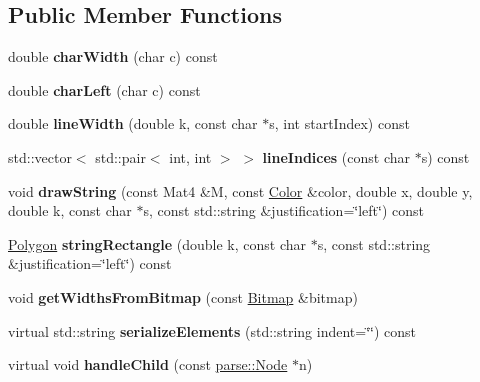 \subsection*{Public Member Functions}
\begin{DoxyCompactItemize}
\item 
\hypertarget{classg2c_1_1_font_aa03376086a0e53e02025277774d4f926}{
double {\bfseries charWidth} (char c) const }
\label{classg2c_1_1_font_aa03376086a0e53e02025277774d4f926}

\item 
\hypertarget{classg2c_1_1_font_a2ac044478305dfd8447c7ba05da0bbcc}{
double {\bfseries charLeft} (char c) const }
\label{classg2c_1_1_font_a2ac044478305dfd8447c7ba05da0bbcc}

\item 
\hypertarget{classg2c_1_1_font_a5712609addff68f271d091e1d3174b0f}{
double {\bfseries lineWidth} (double k, const char $\ast$s, int startIndex) const }
\label{classg2c_1_1_font_a5712609addff68f271d091e1d3174b0f}

\item 
\hypertarget{classg2c_1_1_font_ac47823fde56a234c1c73a479b9eab032}{
std::vector$<$ std::pair$<$ int, int $>$ $>$ {\bfseries lineIndices} (const char $\ast$s) const }
\label{classg2c_1_1_font_ac47823fde56a234c1c73a479b9eab032}

\item 
\hypertarget{classg2c_1_1_font_a7e41d610dbead7da5fadd91f2036ae70}{
void {\bfseries drawString} (const Mat4 \&M, const \hyperlink{classg2c_1_1_color}{Color} \&color, double x, double y, double k, const char $\ast$s, const std::string \&justification=\char`\"{}left\char`\"{}) const }
\label{classg2c_1_1_font_a7e41d610dbead7da5fadd91f2036ae70}

\item 
\hypertarget{classg2c_1_1_font_a8063875af4363343687651fcbc62b917}{
\hyperlink{classg2c_1_1_polygon}{Polygon} {\bfseries stringRectangle} (double k, const char $\ast$s, const std::string \&justification=\char`\"{}left\char`\"{}) const }
\label{classg2c_1_1_font_a8063875af4363343687651fcbc62b917}

\item 
\hypertarget{classg2c_1_1_font_ab866a90a5af638bae26b0f92e48f5046}{
void {\bfseries getWidthsFromBitmap} (const \hyperlink{classg2c_1_1_bitmap}{Bitmap} \&bitmap)}
\label{classg2c_1_1_font_ab866a90a5af638bae26b0f92e48f5046}

\item 
\hypertarget{classg2c_1_1_font_a719d933e2be93c8f8d185451e86bf635}{
virtual std::string {\bfseries serializeElements} (std::string indent=\char`\"{}\char`\"{}) const }
\label{classg2c_1_1_font_a719d933e2be93c8f8d185451e86bf635}

\item 
\hypertarget{classg2c_1_1_font_a2d29920e2f73a9b1eee9fdb452516664}{
virtual void {\bfseries handleChild} (const \hyperlink{classparse_1_1_node}{parse::Node} $\ast$n)}
\label{classg2c_1_1_font_a2d29920e2f73a9b1eee9fdb452516664}

\end{DoxyCompactItemize}
